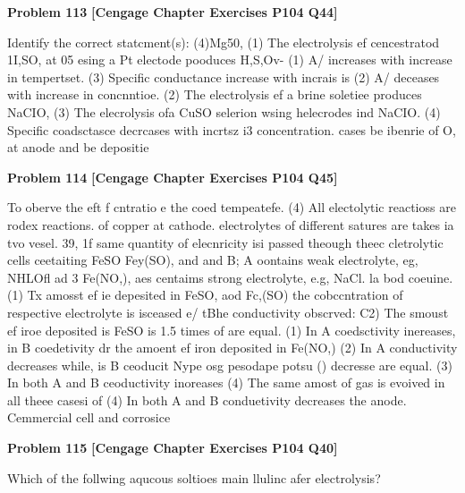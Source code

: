 \begin{problembox}
\textbf{Problem 113} \hfill \textbf{[Cengage Chapter Exercises P104 Q44]}
\label{q:ext-cng-th-113}

Identify the correct statcment(s):
(4)Mg50,
(1) The electrolysis ef cencestratod 1I,SO, at 05  esing
a Pt electode pooduces H,S,Ov-
(1) A/  increases with increase in tempertset.
(3) Specific conductance increase with incrais is
(2) A/  deceases with increase in concnntioe.
(2) The electrolysis ef a brine soletiee produces NaCIO,
(3) The elecrolysis ofa CuSO selerion wsing helecrodes
ind NaCIO.
(4) Specific coadsctasce decrcases with incrtsz i3
concentration.
cases be ibenrie of O, at anode and be depositie
\end{problembox}

\begin{problembox}
\textbf{Problem 114} \hfill \textbf{[Cengage Chapter Exercises P104 Q45]}
\label{q:ext-cng-th-114}

To oberve the eft f cntratio e the coed
tempeatefe.
(4) All electolytic reactioss are rodex reactions.
of copper at cathode.
electrolytes of different satures are takes ia tvo vesel.
39, 1f same quantity of elecnricity isi passed theough theec
cletrolytic cells ceetaiting FeSO Fey(SO), and
and B; A oontains weak electrolyte, eg, NHLOfl ad 3
Fe(NO,), aes
centaims strong electrolyte, e.g, NaCl. la bod coeuine.
(1) Tx amosst ef ie depesited in FeSO, aod Fc,(SO)
the cobccntration of respective electrolyte is isceased e/
tBhe conductivity obscrved:
C2) The smoust ef iroe deposited is FeSO is 1.5 times of
are equal.
(1) In A coedsctivity inereases, in B coedetivity dr
the amoent ef iron deposited in Fe(NO,)
(2) In A conductivity decreases while, is B ceoducit
Nype osg pesodape potsu ()
decresse
are equal.
(3) In both A and B ceoductivity inoreases
(4) The same amost of gas is evoived in all theee casesi of
(4) In both A and B conduetivity decreases
the anode.
Cemmercial cell and corrosice
\end{problembox}

\begin{problembox}
\textbf{Problem 115} \hfill \textbf{[Cengage Chapter Exercises P104 Q40]}
\label{q:ext-cng-th-115}

Which of the follwing aqucous soltioes main llulinc
afer electrolysis?
\end{problembox}

